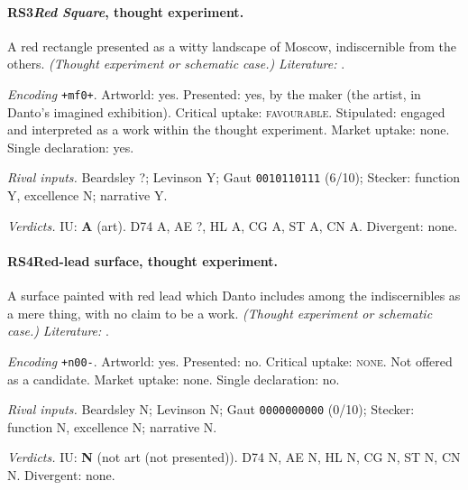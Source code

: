 \paragraph{RS3\enspace \emph{Red Square}, thought experiment.}
A red rectangle presented as a witty landscape of Moscow, indiscernible from the others. \textit{(Thought experiment or schematic case.)} \textit{Literature:} \citet{Danto1981}.\par
\noindent\textit{Encoding} \texttt{+mf0+}. Artworld: yes. Presented: yes, by the maker (the artist, in Danto's imagined exhibition). Critical uptake: \textsc{favourable}. Stipulated: engaged and interpreted as a work within the thought experiment. Market uptake: none. Single declaration: yes.\par
\noindent\textit{Rival inputs.} Beardsley ?; Levinson Y; Gaut \texttt{0010110111} (6/10); Stecker: function Y, excellence N; narrative Y.\par
\noindent\textit{Verdicts.} IU: \textbf{A} (art). D74 A, AE ?, HL A, CG A, ST A, CN A. Divergent: none.\par

\paragraph{RS4\enspace Red-lead surface, thought experiment.}
A surface painted with red lead which Danto includes among the indiscernibles as a mere thing, with no claim to be a work. \textit{(Thought experiment or schematic case.)} \textit{Literature:} \citet{Danto1981}.\par
\noindent\textit{Encoding} \texttt{+n00-}. Artworld: yes. Presented: no. Critical uptake: \textsc{none}. Not offered as a candidate. Market uptake: none. Single declaration: no.\par
\noindent\textit{Rival inputs.} Beardsley N; Levinson N; Gaut \texttt{0000000000} (0/10); Stecker: function N, excellence N; narrative N.\par
\noindent\textit{Verdicts.} IU: \textbf{N} (not art (not presented)). D74 N, AE N, HL N, CG N, ST N, CN N. Divergent: none.\par

